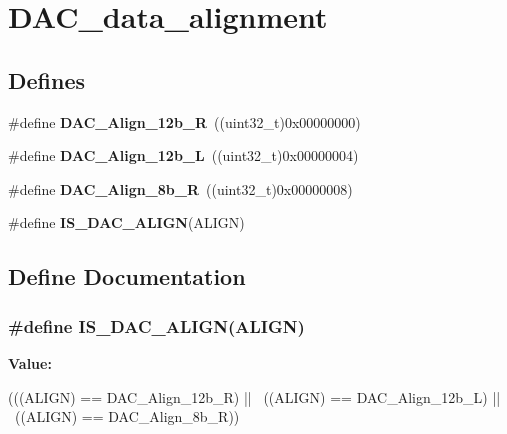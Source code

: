 \hypertarget{group__DAC__data__alignment}{
\section{DAC\_\-data\_\-alignment}
\label{group__DAC__data__alignment}
}
\subsection*{Defines}
\begin{DoxyCompactItemize}
\item 
\hypertarget{group__DAC__data__alignment_ga0f2a6fc71aaf90a27b0caf1bd06e73f2}{
\#define {\bfseries DAC\_\-Align\_\-12b\_\-R}~((uint32\_\-t)0x00000000)}
\label{group__DAC__data__alignment_ga0f2a6fc71aaf90a27b0caf1bd06e73f2}

\item 
\hypertarget{group__DAC__data__alignment_gaf3a46d37092eac0d4c9c1039e68208d4}{
\#define {\bfseries DAC\_\-Align\_\-12b\_\-L}~((uint32\_\-t)0x00000004)}
\label{group__DAC__data__alignment_gaf3a46d37092eac0d4c9c1039e68208d4}

\item 
\hypertarget{group__DAC__data__alignment_gaa633fbcf85e97e12c4894eaed530dd8f}{
\#define {\bfseries DAC\_\-Align\_\-8b\_\-R}~((uint32\_\-t)0x00000008)}
\label{group__DAC__data__alignment_gaa633fbcf85e97e12c4894eaed530dd8f}

\item 
\#define {\bfseries IS\_\-DAC\_\-ALIGN}(ALIGN)
\end{DoxyCompactItemize}


\subsection{Define Documentation}
\hypertarget{group__DAC__data__alignment_ga7779c36606827a6a2c4423414a441bde}{
\subsubsection[{IS\_\-DAC\_\-ALIGN}]{\setlength{\rightskip}{0pt plus 5cm}\#define IS\_\-DAC\_\-ALIGN(ALIGN)}}
\label{group__DAC__data__alignment_ga7779c36606827a6a2c4423414a441bde}
{\bfseries Value:}
\begin{DoxyCode}
(((ALIGN) == DAC_Align_12b_R) || \
                             ((ALIGN) == DAC_Align_12b_L) || \
                             ((ALIGN) == DAC_Align_8b_R))
\end{DoxyCode}
